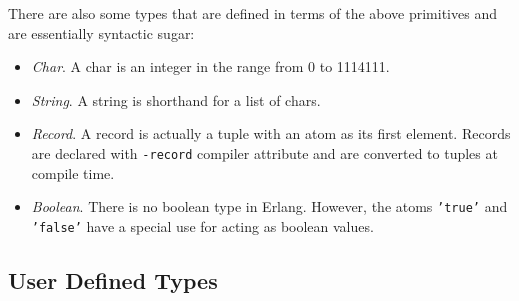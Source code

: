 There are also some types that are defined in terms of the above primitives and
are essentially syntactic sugar:

\begin{itemize}
  \item \emph{Char}. A char is an integer in the range from 0 to 1114111.
  \item \emph{String}. A string is shorthand for a list of chars.
  \item \emph{Record}. A record is actually a tuple with an atom as its first
    element. Records are declared with \texttt{-record} compiler attribute and
    are converted to tuples at compile time.
  \item \emph{Boolean}. There is no boolean type in Erlang. However, the atoms
    \texttt{'true'} and \texttt{'false'} have a special use for acting as
    boolean values.
\end{itemize}

\subsection{User Defined Types}\label{sub:userdef_types}


